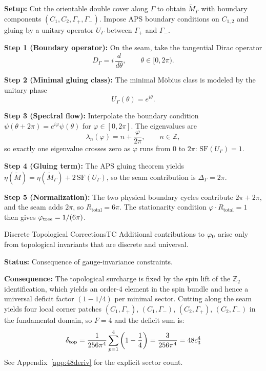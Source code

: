 \begin{tcolorbox}[colback=green!3, colframe=green!50!black, 
    title={\textbf{Proof Sketch for $\phitree = 1/(6\pi)$ (via $\eta$-gluing)}}, fonttitle=\bfseries\small]
\textbf{Setup:} Cut the orientable double cover along $\Gamma$ to obtain
$\widetilde{M}_\Gamma$ with boundary components $(C_1,C_2,\Gamma_+,\Gamma_-)$.
Impose APS boundary conditions on $C_{1,2}$ and gluing by a unitary operator
$U_\Gamma$ between $\Gamma_+$ and $\Gamma_-$.

\textbf{Step 1 (Boundary operator):} On the seam, take the tangential Dirac operator
\begin{equation}
    D_\Gamma = i\,\frac{d}{d\theta}, \qquad \theta\in[0,2\pi).
\end{equation}

\textbf{Step 2 (Minimal gluing class):} The minimal M\"obius class is modeled by the
unitary phase
\begin{equation}
    U_\Gamma(\theta)=e^{i\theta}.
\end{equation}

\textbf{Step 3 (Spectral flow):} Interpolate the boundary condition
$\psi(\theta+2\pi)=e^{i\varphi}\psi(\theta)$ for $\varphi\in[0,2\pi]$. The eigenvalues are
\begin{equation}
    \lambda_n(\varphi)=n+\frac{\varphi}{2\pi}, \qquad n\in\mathbb{Z},
\end{equation}
so exactly one eigenvalue crosses zero as $\varphi$ runs from $0$ to $2\pi$:
$\mathrm{SF}(U_\Gamma)=1$.

\textbf{Step 4 (Gluing term):} The APS gluing theorem yields
$\eta(\widetilde{M}) = \eta(\widetilde{M}_\Gamma) + 2\,\mathrm{SF}(U_\Gamma)$,
so the seam contribution is $\Delta_\Gamma=2\pi$.

\textbf{Step 5 (Normalization):} The two physical boundary cycles contribute $2\pi+2\pi$,
and the seam adds $2\pi$, so $R_{\text{total}}=6\pi$. The stationarity condition
$\varphi\cdot R_{\text{total}}=1$ then gives $\phitree=1/(6\pi)$.
\end{tcolorbox}

\begin{axiom}{Discrete Topological Corrections}{TC}
Additional contributions to $\varphi_0$ arise only from topological invariants 
that are discrete and universal.

\tcblower
\textbf{Status:} Consequence of gauge-invariance constraints.

\textbf{Consequence:} The topological surcharge is fixed by the spin lift of the
$\mathbb{Z}_2$ identification, which yields an order-4 element in the spin bundle
and hence a universal deficit factor $(1-1/4)$ per minimal sector. Cutting along the
seam yields four local corner patches $(C_1,\Gamma_+)$, $(C_1,\Gamma_-)$, $(C_2,\Gamma_+)$,
$(C_2,\Gamma_-)$ in the fundamental domain, so $F=4$ and the deficit sum is:
\begin{equation}
    \delta_{\mathrm{top}} 
    = \frac{1}{256\pi^4}\sum_{p=1}^{4}\left(1-\frac{1}{4}\right)
    = \frac{3}{256\pi^4}
    = 48c_3^4
\end{equation}
See Appendix~\ref{app:48deriv} for the explicit sector count.
\end{axiom}

